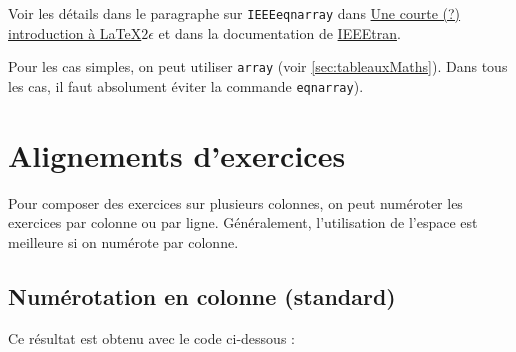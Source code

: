 Voir les détails dans le paragraphe sur \texttt{IEEEeqnarray} dans \href{http://mirror.ctan.org/info/lshort/french/lshort-fr.pdf}{Une courte (?) introduction à \LaTeX$2\epsilon$} et dans la documentation de \href{http://mirror.ctan.org/macros/latex/contrib/IEEEtran/IEEEtran_HOWTO.pdf}{IEEEtran}.

Pour les cas simples, on peut utiliser \texttt{array} (voir \ref{sec:tableauxMaths}). Dans tous les cas, il faut absolument éviter la commande \texttt{eqnarray}).





\newpage





\section{Alignements d'exercices}
\label{sec:alignementExercices}

Pour composer des exercices sur plusieurs colonnes, on peut numéroter les exercices par colonne ou par ligne. Généralement, l'utilisation de l'espace est meilleure si on numérote par colonne.



\subsection{Numérotation en colonne (standard)}

Ce résultat est obtenu avec le code ci-dessous :

